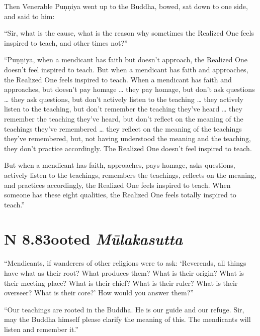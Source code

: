 \documentclass[12pt,openany]{book}%
\newcommand*{\suttatitleacronym}[1]{\smaller[2]{#1}\vspace*{.3em}}
\newcommand*{\suttatitletranslation}[1]{\linebreak{#1}}
\newcommand*{\suttatitleroot}[1]{\linebreak\smaller[2]\itshape{#1}}
\newcommand*{\tocacronym}[1]{\hspace*{-3.3em}{#1}\quad}
\newcommand*{\toctranslation}[1]{#1}
\newcommand*{\tocroot}[1]{(\textit{#1})}
\begin{document}
Then Venerable \textsanskrit{Puṇṇiya} went up to the Buddha, bowed, sat down to one side, and said to him: 

“Sir, what is the cause, what is the reason why sometimes the Realized One feels inspired to teach, and other times not?” 

“\textsanskrit{Puṇṇiya}, when a mendicant has faith but doesn’t approach, the Realized One doesn’t feel inspired to teach. But when a mendicant has faith and approaches, the Realized One feels inspired to teach. When a mendicant has faith and approaches, but doesn’t pay homage … they pay homage, but don’t ask questions … they ask questions, but don’t actively listen to the teaching … they actively listen to the teaching, but don’t remember the teaching they’ve heard … they remember the teaching they’ve heard, but don’t reflect on the meaning of the teachings they’ve remembered … they reflect on the meaning of the teachings they’ve remembered, but, not having understood the meaning and the teaching, they don’t practice accordingly. The Realized One doesn’t feel inspired to teach. 

But when a mendicant has faith, approaches, pays homage, asks questions, actively listen to the teachings, remembers the teachings, reflects on the meaning, and practices accordingly, the Realized One feels inspired to teach. When someone has these eight qualities, the Realized One feels totally inspired to teach.” 

%
\section*{{\suttatitleacronym AN 8.83}{\suttatitletranslation Rooted }{\suttatitleroot Mūlakasutta}}
\addcontentsline{toc}{section}{\tocacronym{AN 8.83} \toctranslation{Rooted } \tocroot{Mūlakasutta}}

“Mendicants, if wanderers of other religions were to ask: ‘Reverends, all things have what as their root? What produces them? What is their origin? What is their meeting place? What is their chief? What is their ruler? What is their overseer? What is their core?’ How would you answer them?” 

“Our teachings are rooted in the Buddha. He is our guide and our refuge. Sir, may the Buddha himself please clarify the meaning of this. The mendicants will listen and remember it.” 
\end{document}
